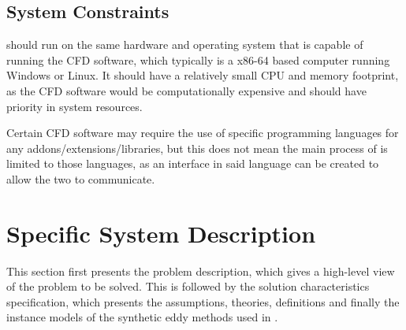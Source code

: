 \documentclass[12pt]{article}
\begin{document}

\subsection{System Constraints}

\progname{} should run on the same hardware and operating system that is capable of running the CFD software, which typically is a x86-64 based computer running Windows or Linux. It should have a relatively small CPU and memory footprint, as the CFD software would be computationally expensive and should have priority in system resources.

Certain CFD software may require the use of specific programming languages for any addons/extensions/libraries, but this does not mean the main process of \progname{} is limited to those languages, as an interface in said language can be created to allow the two to communicate.


\section{Specific System Description} \label{Sec_SSD}

This section first presents the problem description, which gives a high-level
view of the problem to be solved.  This is followed by the solution characteristics
specification, which presents the assumptions, theories, definitions and finally
the instance models of the synthetic eddy methods used in \progname{}.  
\end{document}
